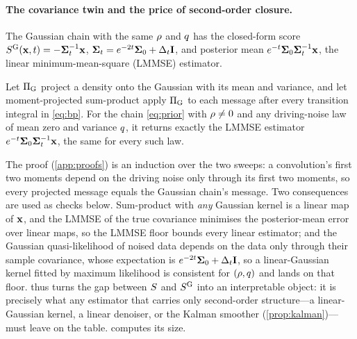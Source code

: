 \paragraph{The covariance twin and the price of second-order closure.}
The Gaussian chain with the same $\rho$ and $q$ has the closed-form score
$S^{\mathrm{G}}(\mathbf{x},t)=-\mathbf{\Sigma}_t^{-1}\mathbf{x}$, $\mathbf{\Sigma}_t=e^{-2t}\mathbf{\Sigma}_0+\Delta_t\mathbf{I}$, and posterior mean
$e^{-t}\mathbf{\Sigma}_0\mathbf{\Sigma}_t^{-1}\mathbf{x}$, the linear minimum-mean-square (LMMSE) estimator.
\begin{proposition}
\label{prop:lmmse}
Let $\Pi_{\mathrm{G}}$ project a density onto the Gaussian with its mean and variance, and let
moment-projected sum-product apply $\Pi_{\mathrm{G}}$ to each message after every transition
integral in \cref{eq:bp}. For the chain \cref{eq:prior} with $\rho\neq0$ and any
driving-noise law of mean zero and variance $q$, it returns exactly the LMMSE estimator
$e^{-t}\mathbf{\Sigma}_0\mathbf{\Sigma}_t^{-1}\mathbf{x}$, the same for every such law.
\end{proposition}
The proof (\cref{app:proofs}) is an induction over the two sweeps: a convolution's first
two moments depend on the driving noise only through its first two moments, so every
projected message equals the Gaussian chain's message. Two consequences are used as
checks below. Sum-product with \emph{any} Gaussian kernel is a linear map of $\mathbf{x}$, and
the LMMSE of the true covariance minimises the posterior-mean error over linear maps,
so the LMMSE floor bounds every linear estimator; and the Gaussian quasi-likelihood of
noised data depends on the data only through their sample covariance, whose expectation
is $e^{-2t}\mathbf{\Sigma}_0+\Delta_t\mathbf{I}$, so a linear-Gaussian kernel fitted by maximum likelihood is
consistent for $(\rho,q)$ and lands on that floor.  thus turns the
gap between $S$ and $S^{\mathrm{G}}$ into an interpretable object: it is precisely what
any estimator that carries only second-order structure---a linear-Gaussian kernel, a
linear denoiser, or the Kalman smoother (\cref{prop:kalman})---must leave on the table. 
computes its size.
